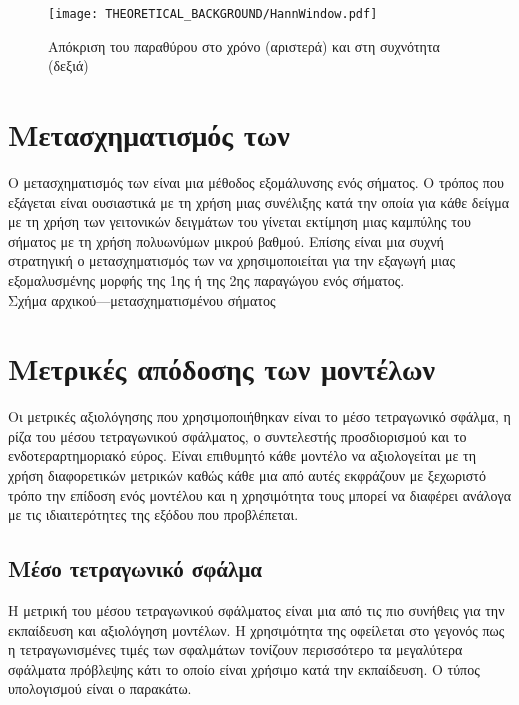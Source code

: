 \begin{figure}[H]
  \begin{center}%
    \texttt{[image: THEORETICAL\_BACKGROUND/HannWindow.pdf]}
    \caption{Απόκριση του παραθύρου  στο χρόνο (αριστερά) και στη συχνότητα (δεξιά)}
  \end{center}
\end{figure}

\section{Μετασχηματισμός των }
Ο μετασχηματισμός των \cite{savitzky_golay} είναι μια μέθοδος εξομάλυνσης ενός σήματος. Ο τρόπος που εξάγεται είναι ουσιαστικά με τη χρήση μιας συνέλιξης κατά την οποία για κάθε δείγμα με τη χρήση των γειτονικών δειγμάτων του γίνεται εκτίμηση μιας καμπύλης του σήματος με τη χρήση πολυωνύμων μικρού βαθμού. Επίσης είναι μια συχνή στρατηγική ο μετασχηματισμός των  να χρησιμοποιείται για την εξαγωγή μιας εξομαλυσμένης μορφής της 1ης ή της 2ης παραγώγου ενός σήματος.\\

Σχήμα αρχικού---μετασχηματισμένου σήματος

\section{Μετρικές απόδοσης των μοντέλων}
Οι μετρικές αξιολόγησης που χρησιμοποιήθηκαν είναι το μέσο τετραγωνικό σφάλμα, η ρίζα του μέσου τετραγωνικού σφάλματος, ο συντελεστής προσδιορισμού και το ενδοτεραρτημοριακό εύρος. Είναι επιθυμητό κάθε μοντέλο να αξιολογείται με τη χρήση διαφορετικών μετρικών καθώς κάθε μια από αυτές εκφράζουν με ξεχωριστό τρόπο την επίδοση ενός μοντέλου και η χρησιμότητα τους μπορεί να διαφέρει ανάλογα με τις ιδιαιτερότητες της εξόδου που προβλέπεται.

\subsection{Μέσο τετραγωνικό σφάλμα}
Η μετρική του μέσου τετραγωνικού σφάλματος είναι μια από τις πιο συνήθεις για την εκπαίδευση και αξιολόγηση μοντέλων. Η χρησιμότητα της οφείλεται στο γεγονός πως η τετραγωνισμένες τιμές των σφαλμάτων τονίζουν περισσότερο τα μεγαλύτερα σφάλματα πρόβλεψης κάτι το οποίο είναι χρήσιμο κατά την εκπαίδευση. Ο τύπος υπολογισμού είναι ο παρακάτω.

